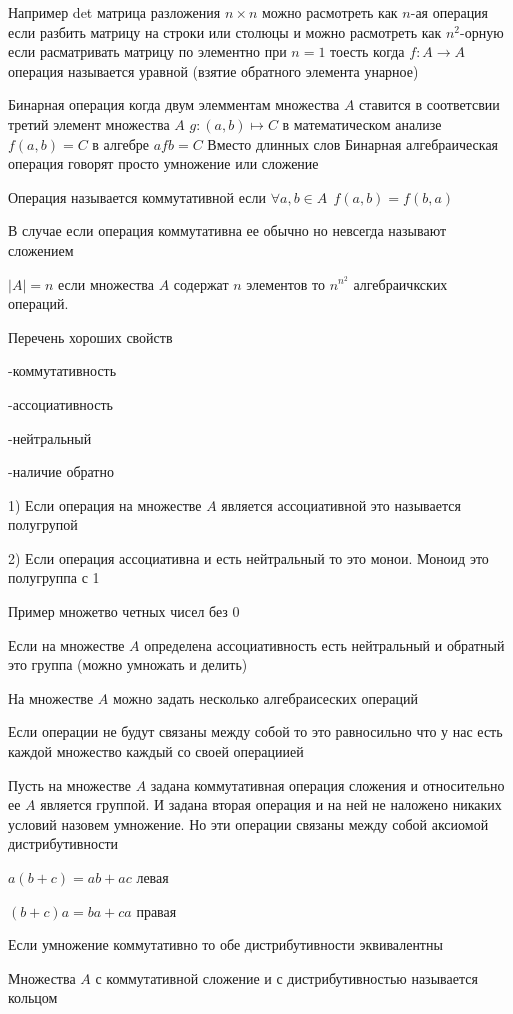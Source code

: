 Например det матрица разложения $n \times n$ можно расмотреть как $n$-ая операция
если разбить матрицу на строки или столюцы и можно расмотреть как $n^2$-орную
если расматривать матрицу по элементно при $n=1$ тоесть когда $f:A \to A$
операция называется уравной (взятие обратного элемента унарное)

Бинарная операция когда двум элемментам множества $A$ ставится в соответсвии
третий элемент множества $A$ $g:(a,b) \mapsto C$ в математическом анализе
$f(a,b) = C$ в алгебре $afb= C$ Вместо длинных слов Бинарная алгебраическая
операция говорят просто умножение или сложение

Операция называется коммутативной если $\forall a,b \in A ~~ f(a,b) = f(b,a)$

В случае если операция коммутативна ее обычно но невсегда называют сложением

$|A| = n$ если множества $A$ содержат $n$ элементов то $n^{n^2}$ алгебраичкских
операций.

Перечень хороших свойств

-коммутативность

-ассоциативность

-нейтральный

-наличие обратно

1) Если операция на множестве $A$ является ассоциативной это называется
полугрупой

2) Если операция ассоциативна и есть нейтральный то это монои. Моноид это
полугруппа с 1

Пример множетво четных чисел без 0

Если на множестве $A$ определена ассоциативность есть нейтральный и обратный
это группа (можно умножать и делить)

На множестве $A$ можно задать несколько алгебраисеских операций

Если операции не будут связаны между собой то это равносильно что у нас есть
каждой множество каждый со своей операциией

Пусть на множестве $A$ задана коммутативная операция сложения и относительно ее
$A$ является группой. И задана вторая операция и на ней не наложено никаких
условий назовем умножение. Но эти операции связаны между собой аксиомой
дистрибутивности

$a(b+c) = ab + ac$ левая

$(b+c)a = ba + ca$ правая

Если умножение коммутативно то обе дистрибутивности эквивалентны

Множества $A$ с коммутативной сложение и с дистрибутивностью называется кольцом

